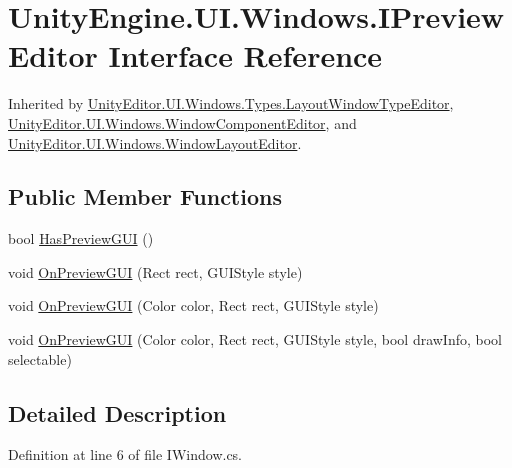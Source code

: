 \hypertarget{interface_unity_engine_1_1_u_i_1_1_windows_1_1_i_preview_editor}{}\section{Unity\+Engine.\+U\+I.\+Windows.\+I\+Preview\+Editor Interface Reference}
\label{interface_unity_engine_1_1_u_i_1_1_windows_1_1_i_preview_editor}


Inherited by \hyperlink{class_unity_editor_1_1_u_i_1_1_windows_1_1_types_1_1_layout_window_type_editor}{Unity\+Editor.\+U\+I.\+Windows.\+Types.\+Layout\+Window\+Type\+Editor}, \hyperlink{class_unity_editor_1_1_u_i_1_1_windows_1_1_window_component_editor}{Unity\+Editor.\+U\+I.\+Windows.\+Window\+Component\+Editor}, and \hyperlink{class_unity_editor_1_1_u_i_1_1_windows_1_1_window_layout_editor}{Unity\+Editor.\+U\+I.\+Windows.\+Window\+Layout\+Editor}.

\subsection*{Public Member Functions}
\begin{DoxyCompactItemize}
\item 
bool \hyperlink{interface_unity_engine_1_1_u_i_1_1_windows_1_1_i_preview_editor_a833440c076d09eeb03f5946a2fd869c0}{Has\+Preview\+G\+U\+I} ()
\item 
void \hyperlink{interface_unity_engine_1_1_u_i_1_1_windows_1_1_i_preview_editor_ac16c09ba7771c8667df1060d07377a89}{On\+Preview\+G\+U\+I} (Rect rect, G\+U\+I\+Style style)
\item 
void \hyperlink{interface_unity_engine_1_1_u_i_1_1_windows_1_1_i_preview_editor_a6a77aca5f154ac9a038d7c0f6caee5bf}{On\+Preview\+G\+U\+I} (Color color, Rect rect, G\+U\+I\+Style style)
\item 
void \hyperlink{interface_unity_engine_1_1_u_i_1_1_windows_1_1_i_preview_editor_a264c28bcd45279a51826e8cba09936ac}{On\+Preview\+G\+U\+I} (Color color, Rect rect, G\+U\+I\+Style style, bool draw\+Info, bool selectable)
\end{DoxyCompactItemize}


\subsection{Detailed Description}


Definition at line 6 of file I\+Window.\+cs.




